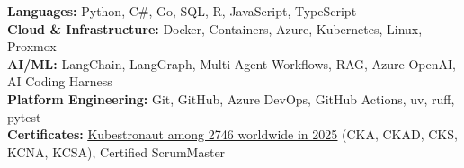 \begin{itemize}[leftmargin=0.15in, label={}]
    \small{\item{
          \textbf{Languages:} {Python, C\#, Go, SQL, R, JavaScript, TypeScript} \\
          \textbf{Cloud \& Infrastructure:} {Docker, Containers, Azure, Kubernetes, Linux, Proxmox} \\
          \textbf{AI/ML:} {LangChain, LangGraph, Multi-Agent Workflows, RAG, Azure OpenAI, AI Coding Harness} \\
          \textbf{Platform Engineering:} {Git, GitHub, Azure DevOps, GitHub Actions, uv, ruff, pytest} \\
          \textbf{Certificates:} \underline{{\href{https://www.credly.com/badges/664b0259-2896-430d-a552-3db866a66d34/linked_in_profile}{Kubestronaut among 2746 worldwide in 2025}}} (CKA, CKAD, CKS, KCNA, KCSA), Certified ScrumMaster \\
          }}
\end{itemize}
